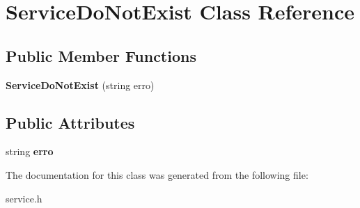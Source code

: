 \hypertarget{class_service_do_not_exist}{}\section{Service\+Do\+Not\+Exist Class Reference}
\label{class_service_do_not_exist}
\subsection*{Public Member Functions}
\begin{DoxyCompactItemize}
\item 
\mbox{\label{class_service_do_not_exist_a972a9da7853eb19d42c57b8661bbbe9d}} 
{\bfseries Service\+Do\+Not\+Exist} (string erro)
\end{DoxyCompactItemize}
\subsection*{Public Attributes}
\begin{DoxyCompactItemize}
\item 
\mbox{\label{class_service_do_not_exist_a8915a28a1a9b0f2c85a411be65b34c91}} 
string {\bfseries erro}
\end{DoxyCompactItemize}


The documentation for this class was generated from the following file\+:\begin{DoxyCompactItemize}
\item 
service.\+h\end{DoxyCompactItemize}
